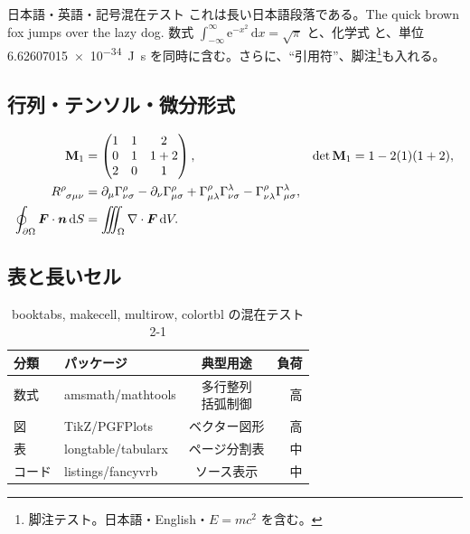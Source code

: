 \documentclass[12pt,a4paper,openany]{ltjsbook}
\theoremstyle{definition}
\theoremstyle{plain}
\theoremstyle{remark}
\newcommand{\dd}{\,\mathrm{d}}
\newcommand{\ee}{\mathrm{e}}
\newcommand{\vect}[1]{\bm{#1}}
\newcommand{\mat}[1]{\mathbf{#1}}
\begin{document}
\begin{bluebox}{日本語・英語・記号混在テスト}
これは長い日本語段落である。The quick brown fox jumps over the lazy dog. 数式 $\int_{-\infty}^{\infty}\ee^{-x^2}\dd x=\sqrt{\pi}$ と、化学式  と、単位 \SI{6.62607015e-34}{\joule\second} を同時に含む。さらに、\enquote{引用符}、脚注\footnote{脚注テスト。日本語・English・$E=mc^2$ を含む。}も入れる。
\end{bluebox}

\subsection{行列・テンソル・微分形式}
\begin{align}
\mat{M}_{1} &=
\begin{pmatrix}
1 & 1 & 2 \\
0 & 1 & 1+2 \\
2 & 0 & 1
\end{pmatrix},
&
\det \mat{M}_{1}&=1-2(1)(1+2),\\
\tensor{R}{^\rho_{\sigma\mu\nu}}&=\partial_\mu \Gamma^\rho_{\nu\sigma}-\partial_\nu\Gamma^\rho_{\mu\sigma}+\Gamma^\rho_{\mu\lambda}\Gamma^\lambda_{\nu\sigma}-\Gamma^\rho_{\nu\lambda}\Gamma^\lambda_{\mu\sigma},\\
\oint_{\partial\Omega}\vect{F}\cdot\vect{n}\dd S&=\iiint_{\Omega}\nabla\cdot\vect{F}\dd V.
\end{align}

\subsection{表と長いセル}
\begin{table}[H]
\centering
\caption{booktabs, makecell, multirow, colortbl の混在テスト 2-1}\label{tab:mix-2-1}
\begin{tabular}{llcr}
\toprule
\rowcolor{softblue} 分類 & パッケージ & 典型用途 & 負荷 \\
\midrule
数式 & amsmath/mathtools & \makecell{多行整列\\括弧制御} & 高 \\
図 & TikZ/PGFPlots & ベクター図形 & 高 \\
表 & longtable/tabularx & ページ分割表 & 中 \\
コード & listings/fancyvrb & ソース表示 & 中 \\
\bottomrule
\end{tabular}
\end{table}
\end{document}
